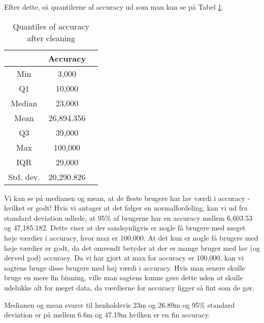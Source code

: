 Efter dette, så quantilerne af accuracy ud som man kan se på Tabel \ref{tab:acc_quantiles}. 
 \begin{table}[htbp]
        \centering
        \small
        \setlength\tabcolsep{2pt}
        \begin{tabular}{|c|c|c|}
            \hline
                         & Accuracy      \\[0pt]
            \hline
                 Min     &  3,000       \\
            \hline
                 Q1      &  10,000   \\
            \hline
                 Median  &  23,000    \\
            \hline
                 Mean    &  26,894.356    \\
            \hline
                 Q3      &  39,000      \\
            \hline
                 Max &  100,000   \\
            \hline
                 IQR     &   29,000     \\
            \hline
                Std. dev.  &  20,290.826   \\
            \hline
        \end{tabular}
        \caption{Quantiles of accuracy after cleaning} %
        \label{tab:acc_quantiles}
\end{table}

Vi kan se på medianen og mean, at de fleste brugere har lav værdi i accuracy - hvilket er godt! Hvis vi antager at det følger en normalfordeling, kan vi ud fra standard deviation udlede, at 95\% af brugerne har en accuracy mellem 6,603.53 og 47,185.182. Dette viser at der sandsynligvis er nogle få brugere med meget høje værdier i accuracy, hvor max er 100,000. At det kun er nogle få brugere med høje værdier er godt, da det omvendt betyder at der er mange bruger med lav (og derved god) accuracy. Da vi har gjort at max for accuracy er 100,000, kan vi sagtens bruge disse brugere med høj værdi i accuracy. Hvis man senere skulle bruge en mere fin binning, ville man sagtens kunne gøre dette uden at skulle udelukke alt for meget data, da værdierne for accuracy ligger så fint som de gør.  

Medianen og mean svarer til henholdsvis 23m og 26.89m og 95\% standard deviation er på mellem 6.6m og 47.19m hvilken er en fin accuracy. 


